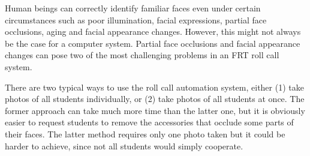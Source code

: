 Human beings can correctly identify familiar faces even under certain circumstances such as poor illumination,
facial expressions, partial face occlusions, aging and facial appearance changes. However, this might not always
be the case for a computer system. Partial face occlusions and facial appearance changes can pose two of the most
challenging problems in an FRT roll call system.
\vspace{0.3cm}

There are two typical ways to use the roll call automation system, either (1) take photos of all students individually,
or (2) take photos of all students at once. The former approach can take much more time than the latter one, but it
is obviously easier to request students to remove the accessories that occlude some parts of their faces. The latter
method requires only one photo taken but it could be harder to achieve, since not all students would simply cooperate.
